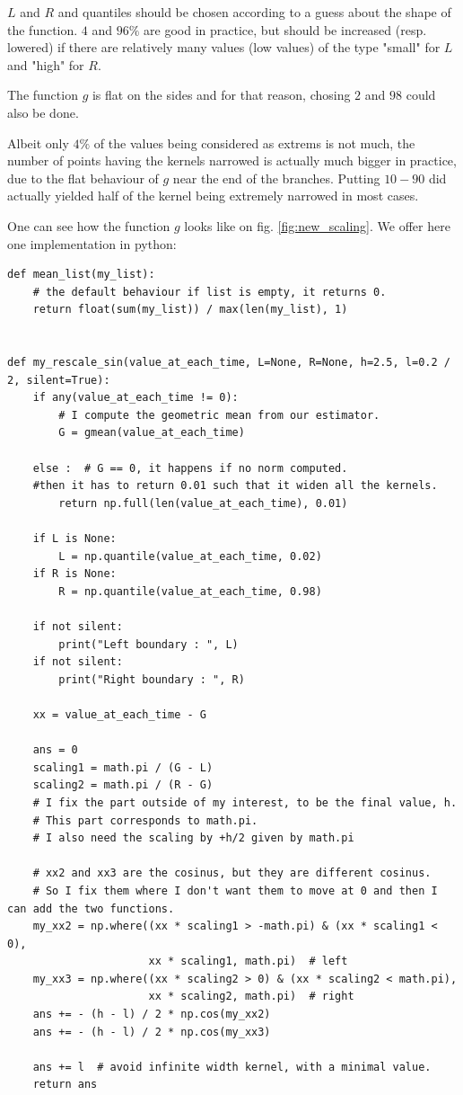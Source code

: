 \documentclass[11pt]{book}
\begin{document}
\begin{remarque}
$L$ and $R$ and quantiles should be chosen according to a guess about the shape of the function. $4$ and $96 \%$ are good in practice, but should be increased (resp. lowered) if there are relatively many values (low values) of the type "small" for $L$ and "high" for $R$. 

The function $g$ is flat on the sides and for that reason, chosing $2$ and $98$ could also be done. 

Albeit only $4\%$ of the values being considered as extrems is not much, the number of points having the kernels narrowed is actually much bigger in practice, due to the flat behaviour of $g$ near the end of the branches. Putting $10-90$ did actually yielded half of the kernel being extremely narrowed in most cases.
\end{remarque}





One can see how the function $g$ looks like on fig. \ref{fig:new_scaling}. We offer here one implementation in python:


\begin{Verbatim}[fontsize=\footnotesize]
def mean_list(my_list):
    # the default behaviour if list is empty, it returns 0.
    return float(sum(my_list)) / max(len(my_list), 1)
    
    
def my_rescale_sin(value_at_each_time, L=None, R=None, h=2.5, l=0.2 / 2, silent=True):
    if any(value_at_each_time != 0):
        # I compute the geometric mean from our estimator.
        G = gmean(value_at_each_time)

    else :  # G == 0, it happens if no norm computed.
    #then it has to return 0.01 such that it widen all the kernels.
        return np.full(len(value_at_each_time), 0.01)

    if L is None:
        L = np.quantile(value_at_each_time, 0.02)
    if R is None:
        R = np.quantile(value_at_each_time, 0.98)

    if not silent:
        print("Left boundary : ", L)
    if not silent:
        print("Right boundary : ", R)

    xx = value_at_each_time - G

    ans = 0
    scaling1 = math.pi / (G - L)
    scaling2 = math.pi / (R - G)
    # I fix the part outside of my interest, to be the final value, h.
    # This part corresponds to math.pi.
    # I also need the scaling by +h/2 given by math.pi

    # xx2 and xx3 are the cosinus, but they are different cosinus.
    # So I fix them where I don't want them to move at 0 and then I can add the two functions.
    my_xx2 = np.where((xx * scaling1 > -math.pi) & (xx * scaling1 < 0),
                      xx * scaling1, math.pi)  # left
    my_xx3 = np.where((xx * scaling2 > 0) & (xx * scaling2 < math.pi),
                      xx * scaling2, math.pi)  # right
    ans += - (h - l) / 2 * np.cos(my_xx2)
    ans += - (h - l) / 2 * np.cos(my_xx3)

    ans += l  # avoid infinite width kernel, with a minimal value.
    return ans
\end{Verbatim}
\end{document}

